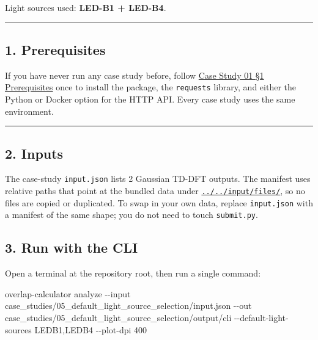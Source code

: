 \documentclass[
  11pt,
]{article}
\newenvironment{Shaded}{}{}
\newcommand{\AttributeTok}[1]{\textcolor[rgb]{0.49,0.56,0.16}{#1}}
\newcommand{\ExtensionTok}[1]{#1}
\newcommand{\NormalTok}[1]{#1}
\begin{document}
Light sources used: \textbf{LED-B1 + LED-B4}.

\begin{center}\rule{0.5\linewidth}{0.5pt}\end{center}

\hypertarget{1-prerequisites}{
\subsection{1. Prerequisites}\label{1-prerequisites}}

If you have never run any case study before, follow
\href{https://github.com/pinarsyt/overlap-calculator/blob/main/case_studies/01_theoretical_only/README.md\#1-prerequisites}{Case
Study 01 §1 Prerequisites} once to install the package, the
\texttt{requests} library, and either the Python or Docker option for
the HTTP API. Every case study uses the same environment.

\begin{center}\rule{0.5\linewidth}{0.5pt}\end{center}

\hypertarget{2-inputs}{
\subsection{2. Inputs}\label{2-inputs}}

The case-study \texttt{input.json} lists 2 Gaussian TD-DFT outputs. The
manifest uses relative paths that point at the bundled data under
\href{https://github.com/pinarsyt/overlap-calculator/blob/main/input/files}{\texttt{../../input/files/}},
so no files are copied or duplicated. To swap in your own data, replace
\texttt{input.json} with a manifest of the same shape; you do not need
to touch \texttt{submit.py}.

\hypertarget{3-run-with-the-cli}{
\subsection{3. Run with the CLI}\label{3-run-with-the-cli}}

Open a terminal at the repository root, then run a single command:

\begin{Shaded}
\begin{Highlighting}[]
\ExtensionTok{overlap{-}calculator}\NormalTok{ analyze }\AttributeTok{{-}{-}input}\NormalTok{ case\_studies/05\_default\_light\_source\_selection/input.json }\AttributeTok{{-}{-}out}\NormalTok{ case\_studies/05\_default\_light\_source\_selection/output/cli }\AttributeTok{{-}{-}default{-}light{-}sources}\NormalTok{ LEDB1,LEDB4 }\AttributeTok{{-}{-}plot{-}dpi}\NormalTok{ 400}
\end{Highlighting}
\end{Shaded}
\end{document}
